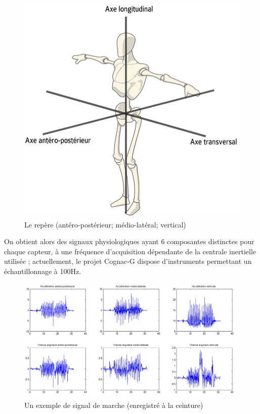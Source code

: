 \documentclass[french,12pt]{report}
\begin{document}
	\begin{figure}[h]
		\includegraphics[scale=0.4]{axis.png}
		\caption{Le repère (antéro-postérieur; médio-latéral; vertical)}
		\label{axis}
	\end{figure}
		
	\vspace{1pc}
	
	On obtient alors des signaux physiologiques ayant 6 composantes distinctes pour chaque capteur, à une fréquence d'acquisition dépendante de la centrale inertielle utilisée ; actuellement, le projet Cognac-G dispose d'instruments permettant un échantillonnage à 100Hz.
	
	\begin{figure}[h]
		\includegraphics[scale=0.5]{ex_signal_back.png}
		\caption{Un exemple de signal de marche (enregistré à la ceinture)}
		\label{ex_signal_back}
	\end{figure}
	
\end{document}
